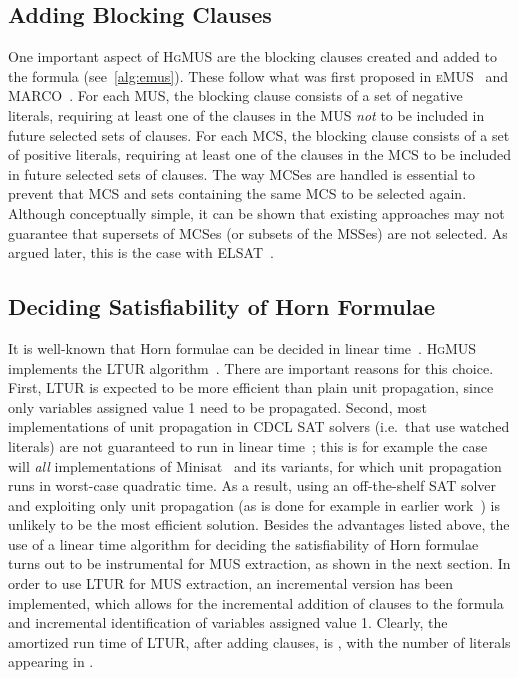 \documentclass{llncs}
\newcommand{\hgmus}{\textsc{HgMUS}\xspace}
\newcommand{\emus}{\textsc{eMUS}\xspace}
\newcommand{\elsat}{ELSAT\xspace}
\begin{document}
\subsection{Adding Blocking Clauses}

One important aspect of \hgmus are the blocking clauses created and
added to the formula  (see~\autoref{alg:emus}).
These follow what was first proposed in \emus~\cite{pms-aaai13} and
MARCO~\cite{liffiton-cpaior13,lpmms-cj15}.
For each MUS, the blocking clause consists of a set of negative
literals, requiring at least one of the clauses in the MUS {\em not}
to be included in future selected sets of clauses. For each MCS, the
blocking clause consists of a set of positive literals, requiring at
least one of the clauses in the MCS to be included in future selected
sets of clauses.
The way MCSes are handled is essential to prevent that MCS and sets
containing the same MCS to be selected again.
Although conceptually simple, it can be shown that existing approaches
may not guarantee that supersets of MCSes (or subsets of the MSSes)
are not selected. As argued later, this is the case with
\elsat~\cite{vescovi-phd11,sebastiani-tr15}.


\subsection{Deciding Satisfiability of Horn Formulae}

It is well-known that Horn formulae can be decided in linear
time~\cite{gallier-jlp84,itai-jlp87,minoux-ipl88}.
\hgmus implements the LTUR algorithm~\cite{minoux-ipl88}. 
There are important reasons for this choice. First, LTUR is expected
to be more efficient than plain unit propagation, since only variables
assigned value 1 need to be propagated. Second, most implementations
of unit propagation in CDCL SAT solvers (i.e.\ that use watched
literals) are not guaranteed to run in linear time~\cite{gent-jair13};
this is for example the case will {\em all} implementations of
Minisat~\cite{een-sat03} and its variants, for which unit propagation
runs in worst-case quadratic time. As a result, using an off-the-shelf
SAT solver and exploiting only unit propagation (as is done for
example in earlier
work~\cite{sebastiani-cade09,sebastiani-tr15,mp-tr15}) is unlikely to
be the most efficient solution.
Besides the advantages listed above, the use of a linear time
algorithm for deciding the satisfiability of Horn formulae turns out
to be instrumental for MUS extraction, as shown in the next section.
In order to use LTUR for MUS extraction, an incremental version has
been implemented, which allows for the incremental addition of clauses
to the formula and incremental identification of variables assigned
value 1. Clearly, the amortized run time of LTUR, after adding  clauses, is , with  the
number of literals appearing in .
\end{document}
